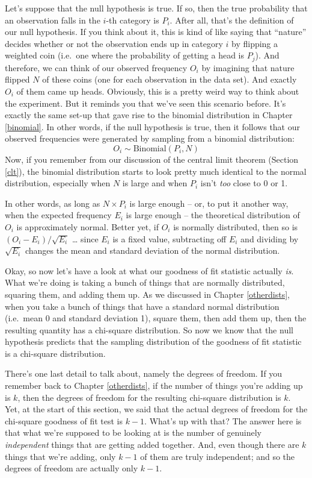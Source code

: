 \documentclass[
]{book}
\theoremstyle{definition}
\theoremstyle{definition}
\theoremstyle{definition}
\theoremstyle{definition}
\theoremstyle{remark}
\begin{document}
Let's suppose that the null hypothesis is true. If so, then the true probability that an observation falls in the \(i\)-th category is \(P_i\). After all, that's the definition of our null hypothesis. If you think about it, this is kind of like saying that ``nature'' decides whether or not the observation ends up in category \(i\) by flipping a weighted coin (i.e.~one where the probability of getting a head is \(P_j\)). And therefore, we can think of our observed frequency \(O_i\) by imagining that nature flipped \(N\) of these coins (one for each observation in the data set). And exactly \(O_i\) of them came up heads. Obviously, this is a pretty weird way to think about the experiment. But it reminds you that we've seen this scenario before. It's exactly the same set-up that gave rise to the binomial distribution in Chapter \ref{binomial}. In other words, if the null hypothesis is true, then it follows that our observed frequencies were generated by sampling from a binomial distribution:
\[
O_i \sim \mbox{Binomial}(P_i, N)
\]
Now, if you remember from our discussion of the central limit theorem (Section \ref{clt}), the binomial distribution starts to look pretty much identical to the normal distribution, especially when \(N\) is large and when \(P_i\) isn't \emph{too} close to 0 or 1.

In other words, as long as \(N \times P_i\) is large enough -- or, to put it another way, when the expected frequency \(E_i\) is large enough -- the theoretical distribution of \(O_i\) is approximately normal. Better yet, if \(O_i\) is normally distributed, then so is \((O_i - E_i)/\sqrt{E_i}\) \ldots{} since \(E_i\) is a fixed value, subtracting off \(E_i\) and dividing by \(\sqrt{E_i}\) changes the mean and standard deviation of the normal distribution.

Okay, so now let's have a look at what our goodness of fit statistic actually \emph{is}. What we're doing is taking a bunch of things that are normally distributed, squaring them, and adding them up. As we discussed in Chapter \ref{otherdists}, when you take a bunch of things that have a standard normal distribution (i.e.~mean 0 and standard deviation 1), square them, then add them up, then the resulting quantity has a chi-square distribution. So now we know that the null hypothesis predicts that the sampling distribution of the goodness of fit statistic is a chi-square distribution.

There's one last detail to talk about, namely the degrees of freedom. If you remember back to Chapter \ref{otherdists}, if the number of things you're adding up is \(k\), then the degrees of freedom for the resulting chi-square distribution is \(k\). Yet, at the start of this section, we said that the actual degrees of freedom for the chi-square goodness of fit test is \(k-1\). What's up with that? The answer here is that what we're supposed to be looking at is the number of genuinely \emph{independent} things that are getting added together. And, even though there are \(k\) things that we're adding, only \(k-1\) of them are truly independent; and so the degrees of freedom are actually only \(k-1\).
\end{document}
